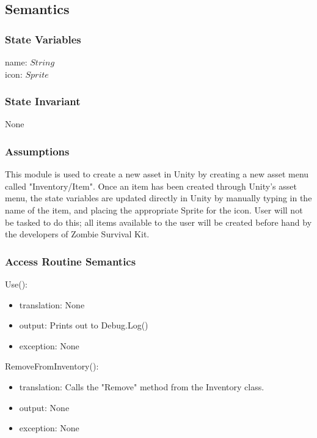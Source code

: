 \documentclass[12pt]{article}
\begin{document}
\subsection* {Semantics}

\subsubsection* {State Variables}

name: $String$\\
icon: $Sprite$

\subsubsection* {State Invariant}

None

\subsubsection* {Assumptions}

This module is used to create a new asset in Unity by creating a new asset menu called "Inventory/Item". Once an item has been created through Unity's asset menu, the state variables are updated directly in Unity by manually typing in the name of the item, and placing the appropriate Sprite for the icon. User will not be tasked to do this; all items available to the user will be created before hand by the developers of Zombie Survival Kit.

\subsubsection* {Access Routine Semantics}

\noindent Use():
\begin{itemize}
\item translation: None
\item output: Prints out to Debug.Log()
\item exception: None
\end{itemize}

\noindent RemoveFromInventory():
\begin{itemize}
\item translation: Calls the "Remove" method from the Inventory class.
\item output: None
\item exception: None
\end{itemize}
\end{document}
